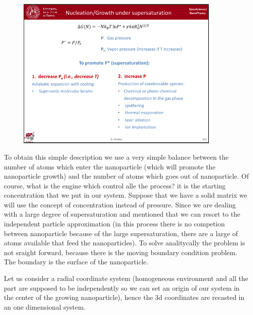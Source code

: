 \documentclass[../main/main.tex]{subfiles}
\begin{document}
\begin{figure}[h!]
\centering
\includegraphics[page=6,width=0.9\textwidth]{../lessons/pdf_file/7_lesson.pdf}
\end{figure}

To obtain this simple description we use a very simple balance between the number of atoms which enter the nanoparticle (which will promote the nanoparticle growth) and the number of atoms which goes out of nanoparticle. Of course, what is the engine which control alle the process? it is the starting concentration that we put in our system. Suppose that we have a solid matrix we will use the concept of concentration instead of pressure. Since we are dealing with a large degree of supersaturation and mentioned that we can resort to the independent particle approximation (in this process there is no competion between nanoparticle because of the large supersaturation, there are a large of atoms available that feed the nanoparticles). To solve analitycally the problem is not  sraight forward, because there is the moving boundary condition problem. The boundary is the surface of the nanoparticle.

Let us consider a radial coordinate system (homogeneous environment and all the part are supposed to be independently so we can set an origin of our system in the center of the growing nanoparticle), hence the 3d coordinates are recasted in an one dimensional system.
\end{document}
